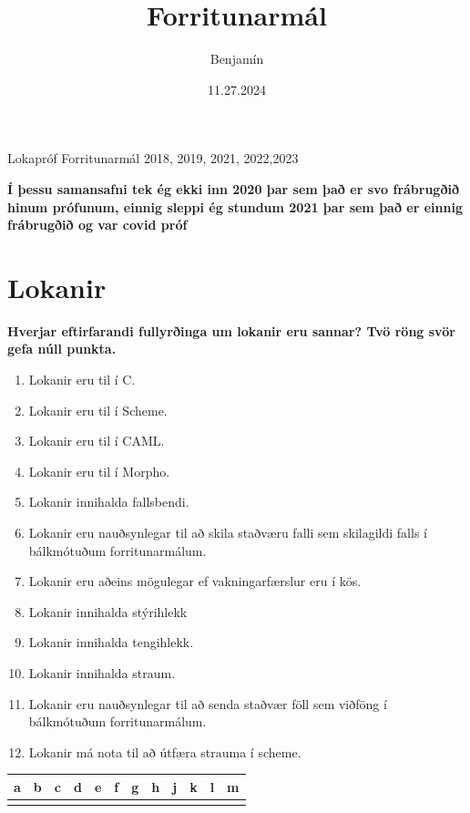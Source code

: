 \documentclass{article}
\title{Forritunarmál}
\author{Benjamín}
\date{11.27.2024}
\newcommand{\bo}[1]{\textbf{#1}}
\newcommand{\enum}{\begin{enumerate}[label = \alph*.]}
\begin{document}
\maketitle

\begin{center}
    \Huge{Lokapróf Forritunarmál 2018, 2019, 2021, 2022,2023}

    \bo{Í þessu samansafni tek ég ekki inn 2020 þar sem það er svo frábrugðið hinum prófunum,
    einnig sleppi ég stundum 2021 þar sem það er einnig frábrugðið og var covid próf}
\end{center}



\newpage

\section{Lokanir}

\bo{Hverjar eftirfarandi fullyrðinga um lokanir eru sannar? Tvö röng
svör gefa núll punkta.}


\enum
\item Lokanir eru til í C.
\item Lokanir eru til í Scheme.
\item Lokanir eru til í CAML.
\item Lokanir eru til í Morpho.
\item Lokanir innihalda fallsbendi.
\item Lokanir eru nauðsynlegar til að skila staðværu falli sem skilagildi
      falls í bálkmótuðum forritunarmálum.
\item Lokanir eru aðeins mögulegar ef vakningarfærslur eru í kös.
\item Lokanir innihalda stýrihlekk
\item Lokanir innihalda tengihlekk.
\item Lokanir innihalda straum.
\item Lokanir eru nauðsynlegar til að senda staðvær föll sem viðföng í bálkmótuðum forritunarmálum.
\item Lokanir má nota til að útfæra strauma í scheme.

\end{enumerate}

\begin{tabularx}{\textwidth}{|X|X|X|X|X|X|X|X|X|X|X|X|}
    \hline
    \bo{a} & \bo{b} & \bo{c} & \bo{d} & \bo{e} & \bo{f} & \bo{g} & \bo{h} & \bo{j} & \bo{k} & \bo{l} & \bo{m} \\ \hline
     & & & & & & & & & & & \\ \hline
\end{tabularx}
\end{document}
